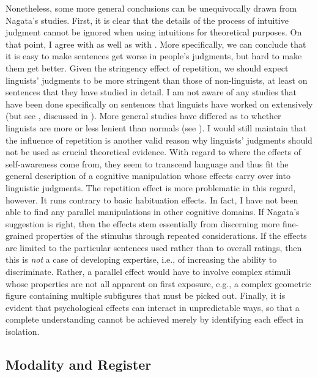 Nonetheless, some more general conclusions can be unequivocally drawn from Nagata's studies. First, it is clear that the details of the process of intuitive judgment cannot be ignored when using intuitions for theoretical purposes. On that point, I agree with \citeauthor{CarrollEtAl1981} as well as with \citeauthor{Nagata1989c}. More specifically, we can conclude that it is easy to make sentences get worse in people's judgments, but hard to make them get better. Given the stringency effect of repetition, we should expect linguists' judgments to be more stringent than those of non-linguists, at least on sentences that they have studied in detail. I am not aware of any studies that have been done specifically on sentences that linguists have worked on extensively (but see \citet{Snyder1994}, discussed in ). More general studies have differed as to whether linguists are more or less lenient than normals (see ). I would still maintain that the influence of repetition is another valid reason why linguists' judgments should not be used as crucial theoretical evidence. With regard to where the effects of self-awareness come from, they seem to transcend language and thus fit the general description of a cognitive manipulation whose effects carry over into linguistic judgments. The repetition effect is more problematic in this regard, however. It runs contrary to basic habituation effects. In fact, I have not been able to find any parallel manipulations in other cognitive domains. If Nagata's suggestion is right, then the effects stem essentially from discerning more fine-grained properties of the stimulus through repeated considerations. If the effects are limited to the particular sentences used rather than to overall ratings, then this is \textit{not} a case of developing expertise, i.e., of increasing the ability to discriminate. Rather, a parallel effect would have to involve complex stimuli whose properties are not all apparent on first exposure, e.g., a complex geometric figure containing multiple subfigures that must be picked out. Finally, it is evident that psychological effects can interact in unpredictable ways, so that a complete understanding cannot be achieved merely by identifying each effect in isolation.

\subsection{Modality and Register}\label{sec:5.2.6}

